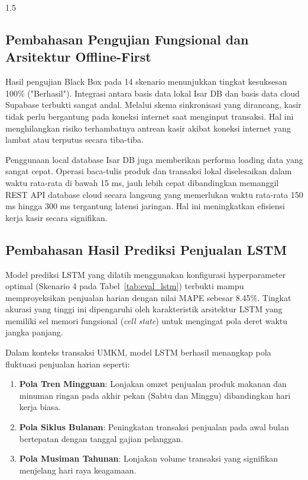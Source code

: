 \documentclass[12pt, a4paper, onecolumn, oneside]{report}
\begin{document}
\begin{spacing}{1.5}
\subsection{Pembahasan Pengujian Fungsional dan Arsitektur Offline-First}

Hasil pengujian Black Box pada 14 skenario menunjukkan tingkat kesuksesan 100\% ("Berhasil"). Integrasi antara basis data lokal Isar DB dan basis data cloud Supabase terbukti sangat andal. Melalui skema sinkronisasi yang dirancang, kasir tidak perlu bergantung pada koneksi internet saat menginput transaksi. Hal ini menghilangkan risiko terhambatnya antrean kasir akibat koneksi internet yang lambat atau terputus secara tiba-tiba.

Penggunaan local database Isar DB juga memberikan performa loading data yang sangat cepat. Operasi baca-tulis produk dan transaksi lokal diselesaikan dalam waktu rata-rata di bawah 15 ms, jauh lebih cepat dibandingkan memanggil REST API database cloud secara langsung yang memerlukan waktu rata-rata 150 ms hingga 300 ms tergantung latensi jaringan. Hal ini meningkatkan efisiensi kerja kasir secara signifikan.

\subsection{Pembahasan Hasil Prediksi Penjualan LSTM}

Model prediksi LSTM yang dilatih menggunakan konfigurasi hyperparameter optimal (Skenario 4 pada Tabel~\ref{tab:eval_lstm}) terbukti mampu memproyeksikan penjualan harian dengan nilai MAPE sebesar 8.45\%. Tingkat akurasi yang tinggi ini dipengaruhi oleh karakteristik arsitektur LSTM yang memiliki sel memori fungsional (\textit{cell state}) untuk mengingat pola deret waktu jangka panjang.

Dalam konteks transaksi UMKM, model LSTM berhasil menangkap pola fluktuasi penjualan harian seperti:
\begin{enumerate}
    \item \textbf{Pola Tren Mingguan}: Lonjakan omzet penjualan produk makanan dan minuman ringan pada akhir pekan (Sabtu dan Minggu) dibandingkan hari kerja biasa.
    \item \textbf{Pola Siklus Bulanan}: Peningkatan transaksi penjualan pada awal bulan bertepatan dengan tanggal gajian pelanggan.
    \item \textbf{Pola Musiman Tahunan}: Lonjakan volume transaksi yang signifikan menjelang hari raya keagamaan.
\end{enumerate}


\end{spacing}
\end{document}
